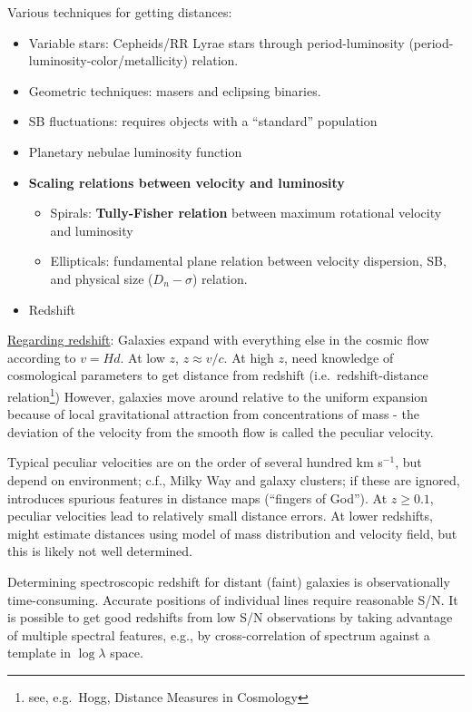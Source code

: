 \documentclass{article}
\begin{document}
Various techniques for getting distances:
\begin{itemize}
    \item Variable stars: Cepheids/RR Lyrae stars through period-luminosity
        (period-luminosity-color/metallicity) relation.
    \item Geometric techniques: masers and eclipsing binaries.
    \item SB fluctuations: requires objects with a ``standard'' population
    \item Planetary nebulae luminosity function
    \item \textbf{Scaling relations between velocity and luminosity}
    \begin{itemize}
      \item Spirals: \textbf{Tully-Fisher relation} between maximum
        rotational velocity and luminosity
      \item Ellipticals: fundamental plane relation between velocity
        dispersion, SB, and physical size
            ($D_{n}-\sigma$) relation.
    \end{itemize}
    \item Redshift
\end{itemize}
\underline{Regarding redshift}:
Galaxies expand with everything else in the cosmic flow according to $v=Hd$.
At low $z$, $z \approx v/c$. At high $z$, need knowledge of cosmological
parameters to get distance from redshift (i.e.\ redshift-distance
relation\footnote{see, e.g.\ Hogg, Distance Measures in Cosmology}) However,
galaxies move around relative to the uniform expansion because of local
gravitational attraction from concentrations of mass - the deviation of the
velocity from the smooth flow is called the peculiar velocity.

Typical peculiar velocities are on the order of several hundred km s$^{-1}$,
but depend on environment; c.f., Milky Way and galaxy clusters; if these
are ignored, introduces spurious features in distance maps (``fingers of
God'').
At $z \geq 0.1$, peculiar velocities lead to relatively small distance
errors. At lower redshifts, might estimate distances using model of mass
distribution and velocity field, but this is likely not well determined.

Determining spectroscopic redshift for distant (faint) galaxies is
observationally time-consuming. Accurate positions of individual lines
require reasonable S/N. It is possible to get good redshifts from low
S/N observations by taking advantage of multiple spectral features,
e.g., by cross-correlation of spectrum against a template
in $\log\lambda$ space.
\end{document}
